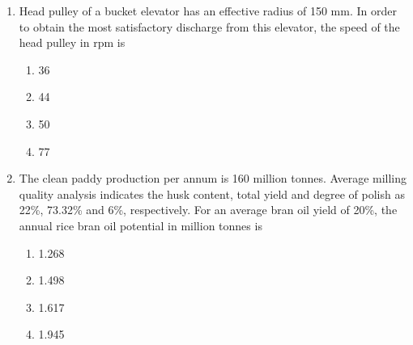 \documentclass[12pt]{article}
\begin{document}
\begin{enumerate}[label=Q.\arabic*]
		\item Head pulley of a bucket elevator has an effective radius of 150 mm. In order to obtain the most satisfactory discharge from this elevator, the speed of the head pulley in rpm is
			\begin{multicols}{4}
				\begin{enumerate}[label=(\Alph*)]
					\item 36
					\item 44
					\item 50
					\item 77
				\end{enumerate}
			\end{multicols}
			\newpage
		\item The clean paddy production per annum is 160 million tonnes. Average milling quality analysis indicates the husk content, total yield and degree of polish as 22\%, 73.32\% and 6\%, respectively. For an average bran oil yield of 20\%, the annual rice bran oil potential in million tonnes is
			\begin{multicols}{4}
				\begin{enumerate}[label=(\Alph*)]
					\item 1.268
					\item 1.498
					\item 1.617
					\item 1.945
				\end{enumerate}
			\end{multicols}


\end{enumerate}
\end{document}
